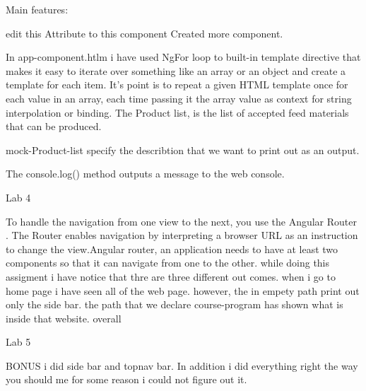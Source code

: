 Main features:

edit this Attribute to this component Created more component.

In app-component.htlm  i have used NgFor loop to built-in template directive that makes it easy to iterate over something like an array or an object and create a template for each item.
It's point is to repeat a given HTML template once for each value in an array, each time passing it the array value as context for string interpolation or binding.
The Product list, is the list of accepted feed materials
that can be produced.

mock-Product-list specify the describtion that we want to print out as an output.

The console.log() method outputs a message to the web console. 





Lab 4

To handle the navigation from one view to the next, you use the Angular Router . The Router enables navigation by interpreting a browser URL as an instruction to change the view.Angular router, an application needs to have at least two components so that it can navigate from one to the other. while doing this assigment i have notice that thre are three different  out comes.
when i go to home page i have seen all of the web page. however, the in empety path print out only the side bar. the path that we declare course-program has shown what is inside that website.
overall 



Lab 5


BONUS i did side bar and topnav bar. In addition i did everything right the way you should me for some reason i could not figure out it.